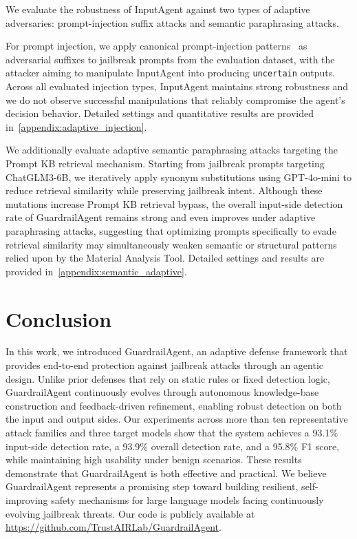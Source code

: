 \documentclass[letterpaper,twocolumn,10pt]{article}
\newcommand{\agentname}{GuardrailAgent\xspace}
\newcommand{\inputagent}{InputAgent\xspace}
\begin{document}
We evaluate the robustness of \inputagent against two types of adaptive adversaries: prompt-injection suffix attacks and semantic paraphrasing attacks.

For prompt injection, we apply canonical prompt-injection patterns~\cite{LJGJG24} as adversarial suffixes to jailbreak prompts from the evaluation dataset, with the attacker aiming to manipulate \inputagent into producing \texttt{uncertain} outputs.
Across all evaluated injection types, \inputagent maintains strong robustness and we do not observe successful manipulations that reliably compromise the agent’s decision behavior.
Detailed settings and quantitative results are provided in~\autoref{appendix:adaptive_injection}.

We additionally evaluate adaptive semantic paraphrasing attacks targeting the Prompt KB retrieval mechanism.
Starting from jailbreak prompts targeting ChatGLM3-6B, we iteratively apply synonym substitutions using GPT-4o-mini to reduce retrieval similarity while preserving jailbreak intent.
Although these mutations increase Prompt KB retrieval bypass, the overall input-side detection rate of \agentname remains strong and even improves under adaptive paraphrasing attacks, suggesting that optimizing prompts specifically to evade retrieval similarity may simultaneously weaken semantic or structural patterns relied upon by the Material Analysis Tool.
Detailed settings and results are provided in~\autoref{appendix:semantic_adaptive}.

\section{Conclusion}

In this work, we introduced \agentname, an adaptive defense framework that provides end-to-end protection against jailbreak attacks through an agentic design.
Unlike prior defenses that rely on static rules or fixed detection logic, \agentname continuously evolves through autonomous knowledge-base construction and feedback-driven refinement, enabling robust detection on both the input and output sides.
Our experiments across more than ten representative attack families and three target models show that the system achieves a 93.1\% input-side detection rate, a 93.9\% overall detection rate, and a 95.8\% F1 score, while maintaining high usability under benign scenarios.
These results demonstrate that \agentname is both effective and practical.
We believe \agentname represents a promising step toward building resilient, self-improving safety mechanisms for large language models facing continuously evolving jailbreak threats.
Our code is publicly available at \url{https://github.com/TrustAIRLab/GuardrailAgent}.
\end{document}
